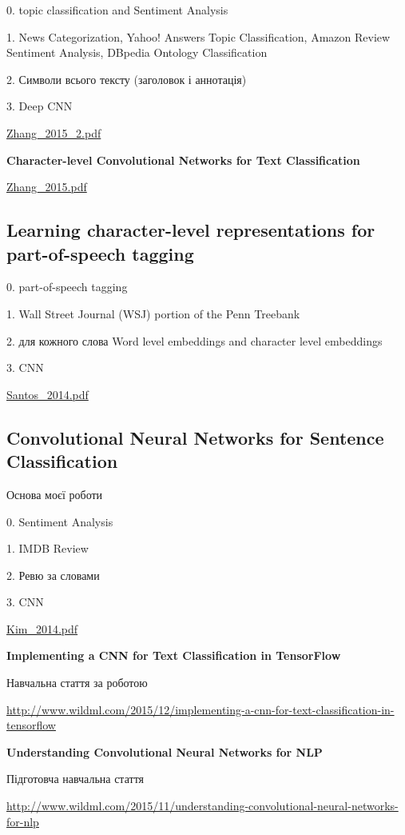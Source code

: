 0. topic classification and Sentiment Analysis

1. News Categorization, Yahoo! Answers Topic Classification, Amazon Review Sentiment Analysis, DBpedia Ontology Classification

2. Символи всього тексту (заголовок і аннотація)

3. Deep CNN

\url{Zhang_2015_2.pdf}\cite{Zhang_2015_2}

\textbf{Character-level Convolutional Networks for Text Classification}

\url{Zhang_2015.pdf}\cite{Zhang_2015}

\subsection{Learning character-level representations for part-of-speech tagging}

0. part-of-speech tagging

1. Wall Street Journal (WSJ) portion of the Penn Treebank

2. для кожного слова Word level embeddings and character level embeddings

3. CNN

\url{Santos_2014.pdf}\cite{Santos_2014}

\subsection{Convolutional Neural Networks for Sentence Classification}

Основа моєї роботи

0. Sentiment Analysis

1. IMDB Review

2. Ревю за словами

3. CNN

\url{Kim_2014.pdf}\cite{Kim_2014} 

\textbf{Implementing a CNN for Text Classification in TensorFlow}

Навчальна стаття за роботою

\url{http://www.wildml.com/2015/12/implementing-a-cnn-for-text-classification-in-tensorflow}\cite{Britz_2015_2}

\textbf{Understanding Convolutional Neural Networks for NLP}

Підготовча навчальна стаття

\url{http://www.wildml.com/2015/11/understanding-convolutional-neural-networks-for-nlp}\cite{Britz_2015}

